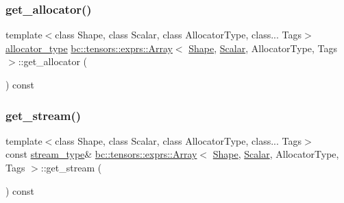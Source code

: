\mbox{\label{structbc_1_1tensors_1_1exprs_1_1Array_a23512d49fbc3734005e92d64ad31a3f8}} 
\subsubsection{\texorpdfstring{get\+\_\+allocator()}{get\_allocator()}}
{\footnotesize\ttfamily template$<$class Shape, class Scalar, class Allocator\+Type, class... Tags$>$ \\
\hyperlink{structbc_1_1tensors_1_1exprs_1_1Array_a990afcebe8817075d427f2653d197140}{allocator\+\_\+type} \hyperlink{structbc_1_1tensors_1_1exprs_1_1Array}{bc\+::tensors\+::exprs\+::\+Array}$<$ \hyperlink{structbc_1_1Shape}{Shape}, \hyperlink{namespacebc_aa12ac55ee2c43dc082894dd3859daee1}{Scalar}, Allocator\+Type, Tags $>$\+::get\+\_\+allocator (\begin{DoxyParamCaption}{ }\end{DoxyParamCaption}) const\hspace{0.3cm}{\ttfamily [inline]}}

\mbox{\label{structbc_1_1tensors_1_1exprs_1_1Array_a1d6e547e956f8f7bbd2a94ad10bd64fa}} 
\subsubsection{\texorpdfstring{get\+\_\+stream()}{get\_stream()}\hspace{0.1cm}{\footnotesize\ttfamily [1/2]}}
{\footnotesize\ttfamily template$<$class Shape, class Scalar, class Allocator\+Type, class... Tags$>$ \\
const \hyperlink{structbc_1_1tensors_1_1exprs_1_1Array_aba97273ba94fb140763e7db5da630ea0}{stream\+\_\+type}\& \hyperlink{structbc_1_1tensors_1_1exprs_1_1Array}{bc\+::tensors\+::exprs\+::\+Array}$<$ \hyperlink{structbc_1_1Shape}{Shape}, \hyperlink{namespacebc_aa12ac55ee2c43dc082894dd3859daee1}{Scalar}, Allocator\+Type, Tags $>$\+::get\+\_\+stream (\begin{DoxyParamCaption}{ }\end{DoxyParamCaption}) const\hspace{0.3cm}{\ttfamily [inline]}}

